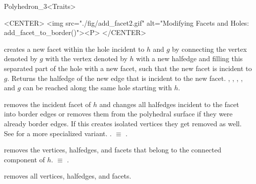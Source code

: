 \begin{ccRefClass}{Polyhedron_3<Traits>}
\begin{ccHtmlOnly}
    <CENTER>
    <img src="./fig/add_facet2.gif" 
     alt="Modifying Facets and Holes: add_facet_to_border()"><P>
    </CENTER>
\end{ccHtmlOnly}

   {creates a new facet within the hole incident to $h$ and $g$ by
    connecting the vertex denoted by $g$ with the vertex denoted by $h$
    with a new halfedge and filling this separated part of the hole with
    a new facet, such that the new facet is incident to $g$. 
    Returns the halfedge of the new edge that is incident to the new facet.
   \ccPrecond {}, , , 
   , and $g$ can be reached along the same hole
   starting with $h$.}



    {removes the incident facet of $h$ and changes all halfedges incident 
     to the facet into border edges or removes them from the
     polyhedral surface if they were already border edges.
     If this creates isolated vertices they get removed as well.
     See  for a more specialized variant.    
     \ccPrecond {}. 
      $\equiv$ .}

    {removes the  vertices, halfedges, and facets that belong to the 
     connected component of $h$. 
       $\equiv$
     .}

    {removes all vertices, halfedges, and facets.}



\begin{ccAdvanced}
  

\end{ccAdvanced}
\end{ccRefClass}
